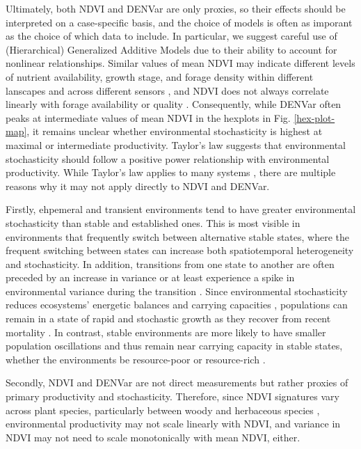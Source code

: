 \documentclass{article}
\begin{document}
Ultimately, both NDVI and DENVar are only proxies, so their effects should be interpreted on a case-specific basis, and the choice of models is often as imporant as the choice of which data to include. In particular, we suggest careful use of (Hierarchical) Generalized Additive Models \citep{wood_generalized_2017, simpson_modelling_2018, pedersen_hierarchical_2019} due to their ability to account for nonlinear relationships. Similar values of mean NDVI may indicate different levels of nutrient availability, growth stage, and forage density within different lanscapes and across different sensors \citep{huang_commentary_2021}, and NDVI does not always correlate linearly with forage availability or quality \citep{johnson_span_2018}. Consequently, while DENVar often peaks at intermediate values of mean NDVI in the hexplots in Fig. \ref{hex-plot-map}, it remains unclear whether environmental stochasticity is highest at maximal or intermediate productivity. Taylor's law \citep{taylor_aggregation_1961} suggests that environmental stochasticity should follow a positive power relationship with environmental productivity. While Taylor's law applies to many systems \citep{kendal_taylors_2004}, there are multiple reasons why it may not apply directly to NDVI and DENVar.

Firstly, ehpemeral and transient environments tend to have greater environmental stochasticity than stable and established ones. This is most visible in environments that frequently switch between alternative stable states, where the frequent switching between states can increase both spatiotemporal heterogeneity and stochasticity. In addition, transitions from one state to another are often preceded by an increase in variance \citep{carpenter_rising_2006} or at least experience a spike in environmental variance during the transition \citep{beisner_alternative_2003}. Since environmental stochasticity reduces ecosystems' energetic balances and carrying capacities \citep{chevin_adaptation_2010}, populations can remain in a state of rapid and stochastic growth as they recover from recent mortality \citep{lande_risks_1993, beisner_alternative_2003, arumugam_tracking_2021}. In contrast, stable environments are more likely to have smaller population oscillations and thus remain near carrying capacity in stable states, whether the environments be resource-poor or resource-rich \citep{beisner_alternative_2003, arumugam_tracking_2021}.

Secondly, NDVI and DENVar are not direct measurements but rather proxies of primary productivity and stochasticity. Therefore, since NDVI signatures vary across plant species, particularly between woody and herbaceous species \citep{huang_commentary_2021}, environmental productivity may not scale linearly with NDVI, and variance in NDVI may not need to scale monotonically with mean NDVI, either.
\end{document}
